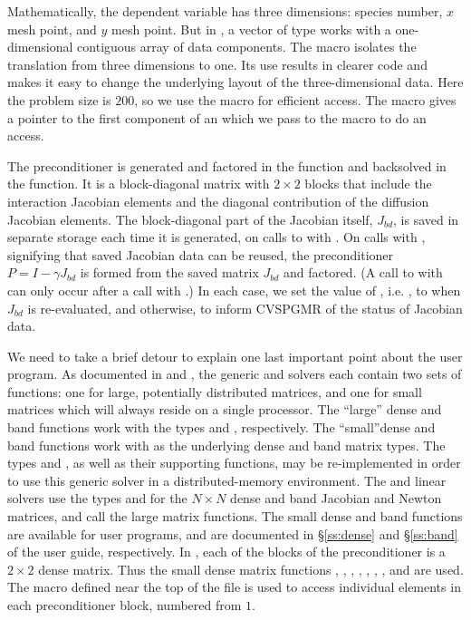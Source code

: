 Mathematically, the dependent variable has three dimensions: species
number, $x$ mesh point, and $y$ mesh point.  But in {\nvecs}, a vector of
type  works with a one-dimensional contiguous array of
data components. The macro  isolates the translation from
three dimensions to one. Its use results in clearer code and makes it
easy to change the underlying layout of the three-dimensional
data. Here the problem size is $200$, so we use the 
macro for efficient  access.  The  macro
gives a pointer to the first component of an  which we
pass to the  macro to do an  access.

The preconditioner is generated and factored in the 
function and backsolved in the  function.  
It is a block-diagonal matrix with $2 \times 2$ blocks that include the
interaction Jacobian elements and the diagonal contribution of the
diffusion Jacobian elements.  The block-diagonal part of the Jacobian
itself, $J_{bd}$, is saved in separate storage each time it is
generated, on calls to  with .
On calls with , signifying that saved Jacobian data
can be reused, the preconditioner $P = I - \gamma J_{bd}$ is formed from the
saved matrix $J_{bd}$ and factored.  (A call to  with
 can only occur after a call with
.) In each case, we set the value of , i.e.
, to  when $J_{bd}$ is re-evaluated,
and  otherwise, to inform CVSPGMR of the status of Jacobian data.

We need to take a brief detour to explain one last important point about
the  user program. As documented in  and ,
the generic {\dense} and {\band} solvers each contain two sets of functions: one
for large, potentially distributed matrices, and one for small matrices which
will always reside on a single processor. The ``large'' dense and band
functions work with the types  and , respectively.
The ``small''dense and band functions work with  as the
underlying dense and band matrix types. The types  and 
, as well as their supporting functions, may be re-implemented
in order to use this generic {\dense} solver in a distributed-memory
environment. The {\cvdense} and {\cvband} linear solvers use the types
 and  for the $N \times N$ dense and band
Jacobian and Newton matrices, and call the large matrix functions. 
The small dense and band functions are available for {\cvode} user
programs, and are documented in \S\ref{ss:dense} and 
\S\ref{ss:band} of the user guide, respectively.
In , each of the blocks of the preconditioner is a 
$2 \times 2$ dense matrix. Thus the small dense matrix functions
, , , , , 
, , and  are used.
The macro  defined near the top of the file is used to access 
individual elements in each preconditioner block, numbered from $1$.

